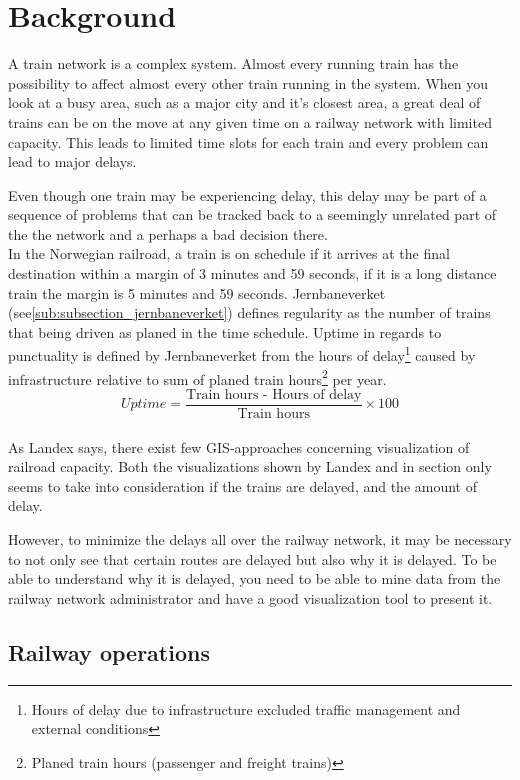 
\chapter{Background}
\label{chapter:background}


A train network is a complex system. Almost every running train has the 
possibility to affect almost every other train running in the system.  When 
you look at a busy area, such as a major city and it's closest
area, a great deal of trains can be on the move at any given time on a
railway network with limited capacity. This leads to limited time slots for each 
train and every problem can lead to major delays.


Even though one train may be experiencing delay, this delay may be part of a
sequence of problems that can be tracked back to a seemingly unrelated part of
the the network and a perhaps a bad decision there\cite{cule2011mining}. \\

In the Norwegian railroad, a train is on schedule if it arrives at the final
destination within a margin of 3 minutes and 59 seconds, if it is a long
distance train the margin is 5 minutes and 59 seconds. 
Jernbaneverket (see\vref{sub:subsection_jernbaneverket}) defines regularity as 
the number of trains that being driven as planed in the time schedule. 
Uptime in regards to punctuality is defined by Jernbaneverket from the hours 
of delay\footnote{Hours of delay due to infrastructure excluded traffic	
management and external conditions} caused by infrastructure relative to sum 
of planed train hours\footnote{Planed train hours (passenger and freight 
trains)} per year.
\cite{jernbaneverketPunklighetsTall}
\begin{equation} Uptime =
		\frac
				{
					\text{Train hours - Hours of delay}
				}
				{
					\text{Train hours}
				}\times 100 
\end{equation}\\

As Landex\cite{landex2009gis} says, there exist few GIS-approaches concerning
visualization of railroad capacity. Both the visualizations shown by Landex and
in section   only seems to take into consideration if
the trains are delayed, and the amount of delay. 

However, to minimize the delays all over the railway network, it may be necessary
to not only see that certain routes are delayed but also why it is delayed. To
be able to understand why it is delayed, you need to be able to mine data from the railway
network administrator and have a good visualization tool to present it. 

\clearpage
\section{Railway operations} %
\label{sec:railway_operations}





